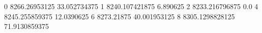 0 8266.26953125 33.052734375
1 8240.107421875 6.890625
2 8233.216796875 0.0
4 8245.255859375 12.0390625
6 8273.21875 40.001953125
8 8305.1298828125 71.9130859375
